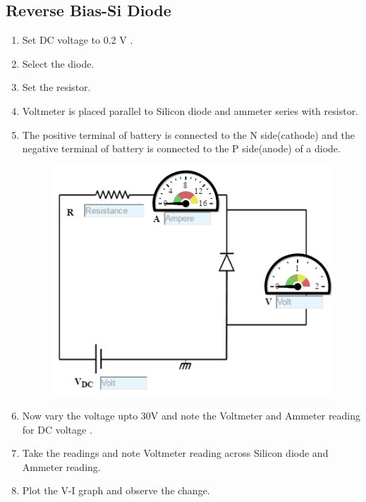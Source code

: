 		\subsection{Reverse Bias-Si Diode}
			\begin{enumerate}
				\tightlist
				\item Set DC voltage to 0.2 V .
				\item Select the diode.
				\item Set the resistor.
				\item Voltmeter is placed parallel to Silicon diode and ammeter series with resistor.
				\item The positive terminal of battery is connected to the N side(cathode) and the negative terminal of battery is connected to the P side(anode) of a diode.
				\begin{figure}[h]
					\centering
					\includegraphics[width=0.3\linewidth]{img/exp5/8}
					\caption{}
					\label{fig:pnjrp}
				\end{figure}
				\item Now vary the voltage upto 30V and note the Voltmeter and Ammeter reading for DC voltage .
				\item Take the readings and note Voltmeter reading across Silicon diode and Ammeter reading.
				\item Plot the V-I graph and observe the change.
			\end{enumerate}
		
